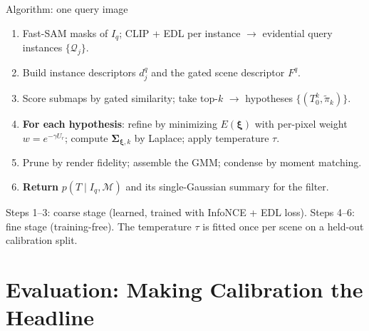 \documentclass[aspectratio=169,10pt]{beamer}
\newcommand{\srcnote}[1]{{\tiny\color{ink!55}#1}}
\begin{document}
\begin{frame}{Algorithm: one query image}
  \begin{enumerate}
    \item Fast-SAM masks of $I_q$; CLIP + EDL per instance
          $\rightarrow$ evidential query instances $\{\mathcal{Q}_j\}$.
    \item Build instance descriptors $d_j^q$ and the gated scene descriptor
          $F^q$.
    \item Score submaps by gated similarity; take top-$k$ $\rightarrow$
          hypotheses $\{(T_0^k, \tilde\pi_k)\}$.
    \item \textbf{For each hypothesis}: refine by minimizing
          $E(\bm\xi)$ with per-pixel weight $w = e^{-\gamma U_r}$;
          compute $\bm\Sigma_{\bm\xi,k}$ by Laplace; apply temperature
          $\tau$.
    \item Prune by render fidelity; assemble the GMM; condense by moment
          matching.
    \item \textbf{Return} $p(T \mid I_q, \mathcal{M})$ and its
          single-Gaussian summary for the filter.
  \end{enumerate}
  \vspace{2mm}
  \srcnote{Steps 1--3: coarse stage (learned, trained with InfoNCE + EDL
  loss). Steps 4--6: fine stage (training-free). The temperature $\tau$ is
  fitted once per scene on a held-out calibration split.}
\end{frame}

\section{Evaluation: Making Calibration the Headline}
\end{document}
